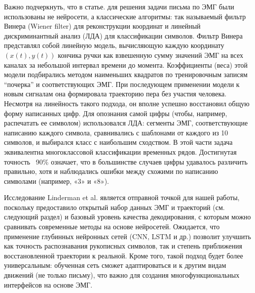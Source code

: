 \documentclass[12pt,a4paper]{article}
\begin{document}
Важно подчеркнуть, что в статье. для решения задачи письма по ЭМГ были использованы не нейросети, а классические алгоритмы: так называемый фильтр Винера (Wiener filter) для реконструкции координат и линейный дискриминантный анализ (ЛДА) для классификации символов. Фильтр Винера представлял собой линейную модель, вычисляющую каждую координату $(x(t), y(t))$ кончика ручки как взвешенную сумму значений ЭМГ на всех каналах за небольшой интервал времени до момента\cite{36, 37}. Коэффициенты (веса) этой модели подбирались методом наименьших квадратов по тренировочным записям “почерка” и соответствующих ЭМГ. При последующем применении модели к новым сигналам она формировала траекторию пера без участия человека. Несмотря на линейность такого подхода, он вполне успешно восстановил общую форму написанных цифр. Для опознания самой цифры (чтобы, например, распечатать ее символом) использовался ЛДА: сегменты ЭМГ, соответствующие написанию каждого символа, сравнивались с шаблонами от каждого из 10 символов, и выбирался класс с наибольшим сходством. В этой части задача эквивалентна многоклассовой классификации временных рядов. Достигнутая точность ~90\% означает, что в большинстве случаев цифры удавалось различить правильно, хотя и наблюдались ошибки между схожими по написанию символами (например, «3» и «8»). 

Исследование Linderman et al. является отправной точкой для нашей работы, поскольку предоставило открытый набор данных ЭМГ и траекторий (см. следующий раздел) и базовый уровень качества декодирования, с которым можно сравнивать современные методы на основе нейросетей. Ожидается, что применение глубинных нейронных сетей (CNN, LSTM и др.) позволит улучшить как точность распознавания рукописных символов, так и степень приближения восстановленной траектории к реальной. Кроме того, такой подход будет более универсальным: обученная сеть сможет адаптироваться и к другим видам движений (не только письму), что важно для создания многофункциональных интерфейсов на основе ЭМГ.
\end{document}
